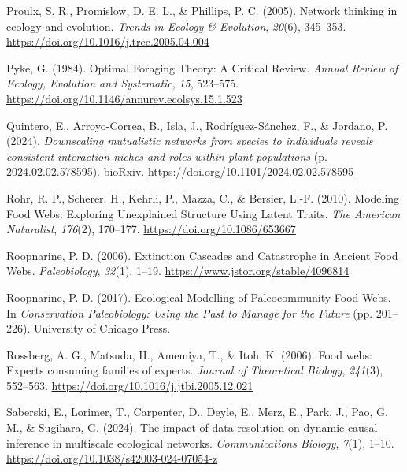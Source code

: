 \documentclass[
]{article}
\newlength{\cslhangindent}
\newenvironment{CSLReferences}[2] %
 {\begin{list}{}{%
  \setlength{\itemindent}{0pt}
  \setlength{\leftmargin}{0pt}
  \setlength{\parsep}{0pt}
  \ifodd #1
   \setlength{\leftmargin}{\cslhangindent}
   \setlength{\itemindent}{-1\cslhangindent}
  \fi
  \setlength{\itemsep}{#2\baselineskip}}}
 {\end{list}}
\begin{document}
\begin{CSLReferences}{1}{0}
Proulx, S. R., Promislow, D. E. L., \& Phillips, P. C. (2005). Network
thinking in ecology and evolution. \emph{Trends in Ecology \&
Evolution}, \emph{20}(6), 345--353.
\url{https://doi.org/10.1016/j.tree.2005.04.004}

Pyke, G. (1984). Optimal {Foraging Theory}: {A Critical Review}.
\emph{Annual Review of Ecology, Evolution and Systematic}, \emph{15},
523--575. \url{https://doi.org/10.1146/annurev.ecolsys.15.1.523}

Quintero, E., Arroyo-Correa, B., Isla, J., Rodríguez-Sánchez, F., \&
Jordano, P. (2024). \emph{Downscaling mutualistic networks from species
to individuals reveals consistent interaction niches and roles within
plant populations} (p. 2024.02.02.578595). bioRxiv.
\url{https://doi.org/10.1101/2024.02.02.578595}

Rohr, R. P., Scherer, H., Kehrli, P., Mazza, C., \& Bersier, L.-F.
(2010). Modeling {Food Webs}: {Exploring Unexplained Structure Using
Latent Traits}. \emph{The American Naturalist}, \emph{176}(2), 170--177.
\url{https://doi.org/10.1086/653667}

Roopnarine, P. D. (2006). Extinction {Cascades} and {Catastrophe} in
{Ancient Food Webs}. \emph{Paleobiology}, \emph{32}(1), 1--19.
\url{https://www.jstor.org/stable/4096814}

Roopnarine, P. D. (2017). Ecological {Modelling} of {Paleocommunity Food
Webs}. In \emph{Conservation {Paleobiology}: {Using} the {Past} to
{Manage} for the {Future}} (pp. 201--226). University of Chicago Press.

Rossberg, A. G., Matsuda, H., Amemiya, T., \& Itoh, K. (2006). Food
webs: {Experts} consuming families of experts. \emph{Journal of
Theoretical Biology}, \emph{241}(3), 552--563.
\url{https://doi.org/10.1016/j.jtbi.2005.12.021}

Saberski, E., Lorimer, T., Carpenter, D., Deyle, E., Merz, E., Park, J.,
Pao, G. M., \& Sugihara, G. (2024). The impact of data resolution on
dynamic causal inference in multiscale ecological networks.
\emph{Communications Biology}, \emph{7}(1), 1--10.
\url{https://doi.org/10.1038/s42003-024-07054-z}


\end{CSLReferences}
\end{document}
